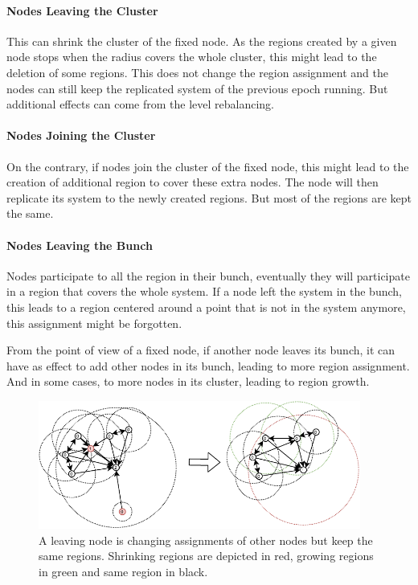 \documentclass[a4paper,11pt,oneside]{report}
\begin{document}
\paragraph{Nodes Leaving the Cluster} 
This can shrink the cluster of the fixed node. As the regions created by a given node stops when
the radius covers the whole cluster, this might lead to the deletion of some
regions. This does not change the
region assignment and the nodes can still keep the replicated system of the
previous epoch running. But additional effects can come from the level rebalancing. 

\paragraph{Nodes Joining the Cluster} 
On the contrary, if nodes join the cluster of the fixed node, this might lead to the creation of
additional region to cover these extra nodes. The node will then replicate its
system to the newly created regions. But most of the regions are kept the same.

\paragraph{Nodes Leaving the Bunch} 
Nodes participate to all the region in their bunch, eventually they will
participate in a region that covers the whole system. If a node left the system
in the bunch,  this leads to a region centered around a point that is not in
the system anymore, this assignment might be forgotten. 

From the point of view of a fixed node, if another node leaves its bunch, it can have
as effect to add other nodes in its bunch, leading to more region assignment.
And in some cases, to more nodes in its cluster, leading to region growth. 

\begin{figure}[!h] 
\centering
\includegraphics[width=300pt]{figures/LocarnoTreaties-Leaving-cluster}
\caption{A leaving node is changing assignments of other
    nodes but keep the same regions. Shrinking regions are depicted in red,
    growing regions in green and same region in black. }
\label{fig:LocarnoTreaties-Leaving-cluster}
\end{figure}
\end{document}
